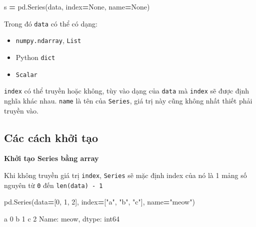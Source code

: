 \documentclass[
]{book}
\newenvironment{Shaded}{\begin{snugshade}}{\end{snugshade}}
\newcommand{\DecValTok}[1]{\textcolor[rgb]{0.00,0.00,0.81}{#1}}
\newcommand{\NormalTok}[1]{#1}
\newcommand{\OperatorTok}[1]{\textcolor[rgb]{0.81,0.36,0.00}{\textbf{#1}}}
\newcommand{\StringTok}[1]{\textcolor[rgb]{0.31,0.60,0.02}{#1}}
\newcommand{\VariableTok}[1]{\textcolor[rgb]{0.00,0.00,0.00}{#1}}
\begin{document}
\begin{Shaded}
\begin{Highlighting}[]
\NormalTok{s }\OperatorTok{=}\NormalTok{ pd.Series(data, index}\OperatorTok{=}\VariableTok{None}\NormalTok{, name}\OperatorTok{=}\VariableTok{None}\NormalTok{)}
\end{Highlighting}
\end{Shaded}

Trong đó \texttt{data} có thể có dạng:

\begin{itemize}
\item
  \texttt{numpy.ndarray}, \texttt{List}
\item
  Python \texttt{dict}
\item
  \texttt{Scalar}
\end{itemize}

\texttt{index} có thể truyền hoặc không, tùy vào dạng của \texttt{data} mà \texttt{index} sẽ được định nghĩa khác nhau.
\texttt{name} là tên của \texttt{Series}, giá trị này cũng không nhất thiết phải truyền vào.

\subsection{Các cách khởi tạo}\label{cuxe1c-cuxe1ch-khux1edfi-tux1ea1o}

\textbf{Khởi tạo Series bằng array}

Khi không truyền giá trị \texttt{index}, \texttt{Series} sẽ mặc định index của nó là 1 mảng số nguyên từ \texttt{0} đến \texttt{len(data)\ -\ 1}

\begin{Shaded}
\begin{Highlighting}[]
\NormalTok{pd.Series(data}\OperatorTok{=}\NormalTok{[}\DecValTok{0}\NormalTok{, }\DecValTok{1}\NormalTok{, }\DecValTok{2}\NormalTok{], index}\OperatorTok{=}\NormalTok{[}\StringTok{"a"}\NormalTok{, }\StringTok{"b"}\NormalTok{, }\StringTok{"c"}\NormalTok{], name}\OperatorTok{=}\StringTok{"meow"}\NormalTok{)}
\end{Highlighting}
\end{Shaded}

\begin{Shaded}
\begin{Highlighting}[]
\NormalTok{a    }\DecValTok{0}
\NormalTok{b    }\DecValTok{1}
\NormalTok{c    }\DecValTok{2}
\NormalTok{Name: meow, dtype: int64}
\end{Highlighting}
\end{Shaded}
\end{document}
